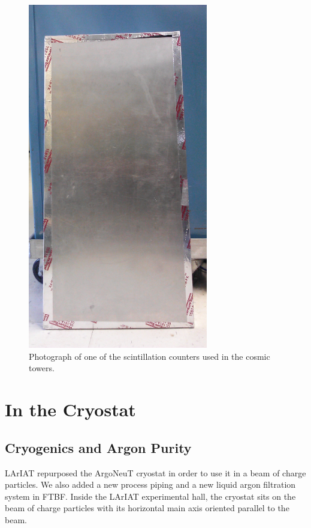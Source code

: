 \begin{figure}[h!]
\centering
 \includegraphics[angle=90,width=0.7\textwidth]{Chapter-3/Images/Cosmic_Paddle.jpg}
\caption{Photograph of one of the scintillation counters used in the cosmic towers. } 
\label{pic:cosmicpaddle}
\end{figure}





\section{In the Cryostat}
\subsection{Cryogenics and Argon Purity}\label{ch:Cryo}
LArIAT repurposed the ArgoNeuT cryostat \cite{argoneut} in order to use it in a beam of charge particles. We also added a new process piping and a new liquid argon filtration system in FTBF.
Inside the LArIAT experimental hall, the cryostat sits on the beam of charge particles with its horizontal main axis oriented parallel to the beam.

